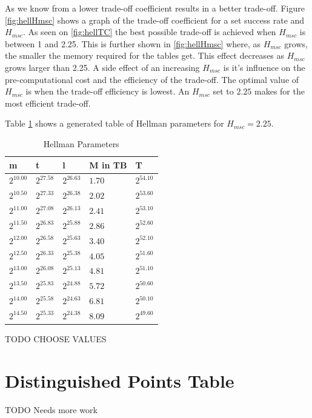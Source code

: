 As we know from \cite{176} a lower trade-off coefficient results in a
better trade-off. Figure \ref{fig:hellHmsc} shows a graph of the
trade-off coefficient for a set success rate and $H_{msc}$.
As seen on \ref{fig:hellTC} the best possible trade-off is achieved
when $H_{msc}$ is between 1 and 2.25. This is further shown in
\ref{fig:hellHmsc} where, as $H_{msc}$ grows, the smaller the memory
required for the tables get. This effect decreases as $H_{msc}$ grows
larger than 2.25. A side effect of an increasing $H_{msc}$ is it's
influence on the pre-computational cost and the efficiency of the
trade-off. The optimal value of $H_{msc}$ is when the trade-off
efficiency is lowest. An $H_{msc}$ set to $2.25$ makes for the most
efficient trade-off.

Table \ref{tab:hellparam} shows a generated table of Hellman
parameters for $H_{msc} =2.25$. 
\begin{table}[H]
  \centering
\begin{tabular}{lllll}
m & t & l & M in TB & T \\\hline
$2^{10.00}$ & $2^{27.58}$ & $2^{26.63}$ & $1.70$ & $2^{54.10}$ \\
$2^{10.50}$ & $2^{27.33}$ & $2^{26.38}$ & $2.02$ & $2^{53.60}$ \\
$2^{11.00}$ & $2^{27.08}$ & $2^{26.13}$ & $2.41$ & $2^{53.10}$ \\
$2^{11.50}$ & $2^{26.83}$ & $2^{25.88}$ & $2.86$ & $2^{52.60}$ \\
$2^{12.00}$ & $2^{26.58}$ & $2^{25.63}$ & $3.40$ & $2^{52.10}$ \\
$2^{12.50}$ & $2^{26.33}$ & $2^{25.38}$ & $4.05$ & $2^{51.60}$ \\
$2^{13.00}$ & $2^{26.08}$ & $2^{25.13}$ & $4.81$ & $2^{51.10}$ \\
$2^{13.50}$ & $2^{25.83}$ & $2^{24.88}$ & $5.72$ & $2^{50.60}$ \\
$2^{14.00}$ & $2^{25.58}$ & $2^{24.63}$ & $6.81$ & $2^{50.10}$ \\
$2^{14.50}$ & $2^{25.33}$ & $2^{24.38}$ & $8.09$ & $2^{49.60}$ \\
\end{tabular}
  \caption{Hellman Parameters}
  \label{tab:hellparam}
\end{table}

TODO CHOOSE VALUES

\section{Distinguished Points Table}
TODO Needs more work

